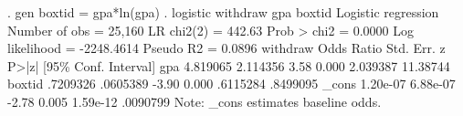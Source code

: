 . gen boxtid = gpa*ln(gpa)
{\smallskip}
. logistic withdraw gpa boxtid
{\smallskip}
Logistic regression                             Number of obs     =     25,160
                                                LR chi2(2)        =     442.63
                                                Prob > chi2       =     0.0000
Log likelihood = -2248.4614                     Pseudo R2         =     0.0896
{\smallskip}
    withdraw {\VBAR} Odds Ratio   Std. Err.      z    P>|z|     [95\% Conf. Interval]
         gpa {\VBAR}   4.819065   2.114356     3.58   0.000     2.039387    11.38744
      boxtid {\VBAR}   .7209326   .0605389    -3.90   0.000     .6115284    .8499095
       _cons {\VBAR}   1.20e-07   6.88e-07    -2.78   0.005     1.59e-12    .0090799
Note: _cons estimates baseline odds.
{\smallskip}
